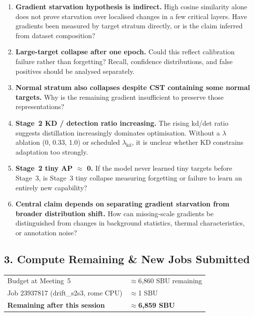 \begin{enumerate}
    \item \textbf{Gradient starvation hypothesis is indirect.}
    High cosine similarity alone does not prove starvation over localised
    changes in a few critical layers. Have gradients been measured by target
    stratum directly, or is the claim inferred from dataset composition?

    \item \textbf{Large-target collapse after one epoch.}
    Could this reflect calibration failure rather than forgetting? Recall,
    confidence distributions, and false positives should be analysed separately.

    \item \textbf{Normal stratum also collapses despite CST containing
    some normal targets.}
    Why is the remaining gradient insufficient to preserve those representations?

    \item \textbf{Stage~2 KD / detection ratio increasing.}
    The rising kd/det ratio suggests distillation increasingly dominates
    optimisation. Without a $\lambda$ ablation (0, 0.33, 1.0) or scheduled
    $\lambda_{\mathrm{kd}}$, it is unclear whether KD constrains adaptation
    too strongly.

    \item \textbf{Stage~2 tiny AP $\approx$ 0.}
    If the model never learned tiny targets before Stage~3, is Stage~3 tiny
    collapse measuring forgetting or failure to learn an entirely new capability?

    \item \textbf{Central claim depends on separating gradient starvation
    from broader distribution shift.}
    How can missing-scale gradients be distinguished from changes in
    background statistics, thermal characteristics, or annotation noise?
\end{enumerate}

\subsection*{3. Compute Remaining \& New Jobs Submitted}

\begin{table}[h]
\centering
\small
\begin{tabular}{ll}
\hline
Budget at Meeting~5      & $\approx$6,860 SBU remaining \\
Job 23937817 (drift\_s2s3, rome CPU) & $\approx$1 SBU \\
\textbf{Remaining after this session} & \textbf{$\approx$6,859 SBU} \\
\hline
\end{tabular}
\end{table}

